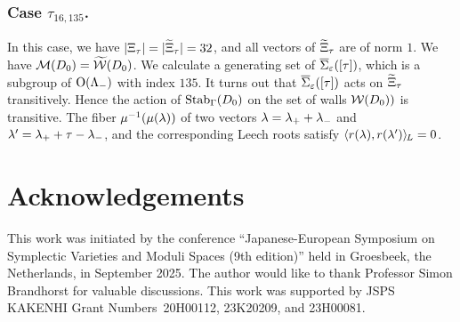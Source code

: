 \documentclass{amsart} %
\begin{document}
\subsubsection{Case $\tau_{16, 135}$.}
In this case,
we have $|\Xi_{\tau}|=|\widetilde{\Xi}_{\tau}|=32$,
and all vectors of $\widetilde{\Xi}_{\tau}$ are of norm $1$.
We have $\mathord{\mathcal{M}}(D_0)=\widetilde{\mathord{\mathcal{W}}}(D_0)$.
We calculate a generating set of $\overline{\Sigma}_{\varepsilon} ([\tau])$,
which is a subgroup of $ \mathord{\mathrm{O}}(\Lambda_{-})$ with index $135$.
It turns out that $\overline{\Sigma}_{\varepsilon} ([\tau])$ acts on $\widetilde{\Xi}_{\tau}$ transitively.
Hence the action of $\operatorname{Stab}_{\Gamma}(D_0)$ on the set of walls $\mathord{\mathcal{W}}(D_0))$ is transitive.
The fiber 
 $\mu^{-1}(\mu(\lambda))$ 
of two vectors
$\lambda={\lambda}_{+}+{\lambda}_{-}$ and $\lambda^{\prime}={\lambda}_{+}+\tau-{\lambda}_{-}$, and 
the corresponding Leech roots 
 satisfy
$\langle r(\lambda), r(\lambda^{\prime}) \rangle_{\hskip -1pt L}=0$.
%
 
\section*{Acknowledgements}
This work was initiated by the conference 
``Japanese-European Symposium on Symplectic Varieties and Moduli Spaces (9th edition)''
held in Groesbeek, the Netherlands,  in September 2025.
The author would like to thank Professor Simon Brandhorst for valuable discussions.
This work was supported by JSPS KAKENHI Grant Numbers~20H00112, 23K20209, and 23H00081.

 
%
%



%
\end{document}
